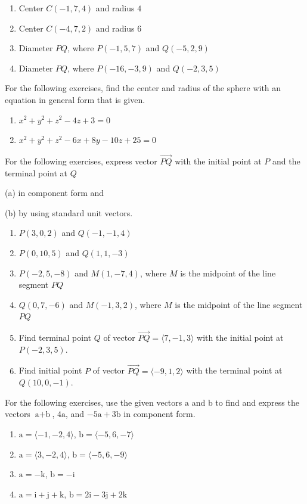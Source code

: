 \documentclass{exercises}
\begin{document}
\begin{enumerate}[resume]
\item Center $C(-1,7,4)$ and radius $4$
\item Center $C(-4,7,2)$ and radius $6$
\item Diameter $PQ$, where $P(-1,5,7)$ and $Q(-5,2,9)$
\item Diameter $PQ$, where $P(-16,-3,9)$ and $Q(-2,3,5)$
\end{enumerate}

For the following exercises, find the center and radius of the sphere with an equation in general form that is given.

\begin{enumerate}[resume]
\item $x^{2}+y^{2}+z^{2}-4z+3=0$
\item $x^{2}+y^{2}+z^{2}-6x+8y-10z+25=0$
\end{enumerate}

For the following exercises, express vector $\overset{\to}{PQ}$ with the initial point at $P$ and the terminal point at $Q$


(a) in component form and


(b) by using standard unit vectors.

\begin{enumerate}[resume]
\item $P(3,0,2)$ and $Q(-1,-1,4)$
\item $P(0,10,5)$ and $Q(1,1,-3)$
\item $P(-2,5,-8)$ and $M(1,-7,4)$, where $M$ is the midpoint of the line segment $PQ$
\item $Q(0,7,-6)$ and $M(-1,3,2)$, where $M$ is the midpoint of the line segment $PQ$
\item Find terminal point $Q$ of vector $\overset{\to}{PQ}=\langle7,-1,3\rangle$ with the initial point at $P(-2,3,5)$.
\item Find initial point $P$ of vector $\overset{\to}{PQ}=\langle-9,1,2\rangle$ with the terminal point at $Q(10,0,-1)$.
\end{enumerate}

For the following exercises, use the given vectors $\text{a}$ and $\text{b}$ to find and express the vectors $\text{a}+\text{b}$, $4\text{a}$, and $-5\text{a}+3\text{b}$ in component form.

\begin{enumerate}[resume]
\item $\text{a}=\langle-1,-2,4\rangle$, $\text{b}=\langle-5,6,-7\rangle$
\item $\text{a}=\langle3,-2,4\rangle$, $\text{b}=\langle-5,6,-9\rangle$
\item $\text{a}=-\text{k}$, $\text{b}=-\text{i}$
\item $\text{a}=\text{i}+\text{j}+\text{k}$, $\text{b}=2\text{i}-3\text{j}+2\text{k}$
\end{enumerate}
\end{document}
